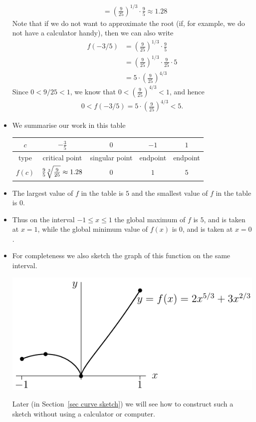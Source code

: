 \begin{eg}
\begin{itemize}
\begin{align*}
  &= \left(\frac{9}{25}\right)^{1/3} \cdot \frac{9}{5}  \approx 1.28
\end{align*}
Note that if we do not want to approximate the root (if, for example, we do not have a
calculator handy), then we can also write
\begin{align*}
  f(-3/5) &= \left(\frac{9}{25}\right)^{1/3} \cdot \frac{9}{5} \\
  &= \left(\frac{9}{25}\right)^{1/3} \cdot \frac{9}{25} \cdot 5 \\
  &= 5 \cdot \left( \frac{9}{25} \right)^{4/3}
\end{align*}
Since $0<9/25<1$, we know that $0 < \left( \frac{9}{25} \right)^{4/3} < 1$, and hence
\begin{align*}
  0 < f(-3/5) = 5 \cdot \left( \frac{9}{25} \right)^{4/3} < 5.
\end{align*}

\item We summarise our work in this table
\begin{center}
\begin{tabular}{|c||c|c|c|c|}
\hline
$c$ & $-\frac{3}{5}$ &  $0$ &  $-1$ & $1$ \\
\hline
type & critical point & singular point & endpoint & endpoint \\
\hline
$f(c)$ & $\frac{9}{5}\root{3}\of{\frac{9}{25}}\approx 1.28$ & $0$ & $1$ & $5$\\
\hline
\end{tabular}
\end{center}
\item The largest value of $f$ in the table is $5$ and the smallest value of $f$ in the
table is $0$.
\item Thus on the interval $-1\leq x \leq 1$ the global maximum of $f$ is $5$, and is
taken at $x=1$, while the global minimum value of $f(x)$ is $0$, and is taken at $x=0$.

\item For completeness we also sketch the graph of this function on the same interval.
\begin{efig}
\begin{center}
   \includegraphics{globalMaxMinA}
\end{center}
\end{efig}
Later (in Section~\ref{sec curve sketch}) we will see how to construct such a sketch
without using a calculator or computer.
\end{itemize}
\end{eg}


